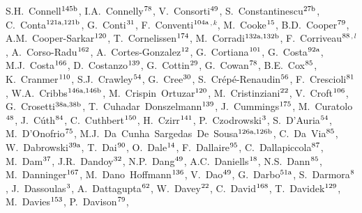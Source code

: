 \begin{flushleft}
S.H.~Connell$^\textrm{\scriptsize 145b}$,
I.A.~Connelly$^\textrm{\scriptsize 78}$,
V.~Consorti$^\textrm{\scriptsize 49}$,
S.~Constantinescu$^\textrm{\scriptsize 27b}$,
C.~Conta$^\textrm{\scriptsize 121a,121b}$,
G.~Conti$^\textrm{\scriptsize 31}$,
F.~Conventi$^\textrm{\scriptsize 104a}$$^{,k}$,
M.~Cooke$^\textrm{\scriptsize 15}$,
B.D.~Cooper$^\textrm{\scriptsize 79}$,
A.M.~Cooper-Sarkar$^\textrm{\scriptsize 120}$,
T.~Cornelissen$^\textrm{\scriptsize 174}$,
M.~Corradi$^\textrm{\scriptsize 132a,132b}$,
F.~Corriveau$^\textrm{\scriptsize 88}$$^{,l}$,
A.~Corso-Radu$^\textrm{\scriptsize 162}$,
A.~Cortes-Gonzalez$^\textrm{\scriptsize 12}$,
G.~Cortiana$^\textrm{\scriptsize 101}$,
G.~Costa$^\textrm{\scriptsize 92a}$,
M.J.~Costa$^\textrm{\scriptsize 166}$,
D.~Costanzo$^\textrm{\scriptsize 139}$,
G.~Cottin$^\textrm{\scriptsize 29}$,
G.~Cowan$^\textrm{\scriptsize 78}$,
B.E.~Cox$^\textrm{\scriptsize 85}$,
K.~Cranmer$^\textrm{\scriptsize 110}$,
S.J.~Crawley$^\textrm{\scriptsize 54}$,
G.~Cree$^\textrm{\scriptsize 30}$,
S.~Cr\'ep\'e-Renaudin$^\textrm{\scriptsize 56}$,
F.~Crescioli$^\textrm{\scriptsize 81}$,
W.A.~Cribbs$^\textrm{\scriptsize 146a,146b}$,
M.~Crispin~Ortuzar$^\textrm{\scriptsize 120}$,
M.~Cristinziani$^\textrm{\scriptsize 22}$,
V.~Croft$^\textrm{\scriptsize 106}$,
G.~Crosetti$^\textrm{\scriptsize 38a,38b}$,
T.~Cuhadar~Donszelmann$^\textrm{\scriptsize 139}$,
J.~Cummings$^\textrm{\scriptsize 175}$,
M.~Curatolo$^\textrm{\scriptsize 48}$,
J.~C\'uth$^\textrm{\scriptsize 84}$,
C.~Cuthbert$^\textrm{\scriptsize 150}$,
H.~Czirr$^\textrm{\scriptsize 141}$,
P.~Czodrowski$^\textrm{\scriptsize 3}$,
S.~D'Auria$^\textrm{\scriptsize 54}$,
M.~D'Onofrio$^\textrm{\scriptsize 75}$,
M.J.~Da~Cunha~Sargedas~De~Sousa$^\textrm{\scriptsize 126a,126b}$,
C.~Da~Via$^\textrm{\scriptsize 85}$,
W.~Dabrowski$^\textrm{\scriptsize 39a}$,
T.~Dai$^\textrm{\scriptsize 90}$,
O.~Dale$^\textrm{\scriptsize 14}$,
F.~Dallaire$^\textrm{\scriptsize 95}$,
C.~Dallapiccola$^\textrm{\scriptsize 87}$,
M.~Dam$^\textrm{\scriptsize 37}$,
J.R.~Dandoy$^\textrm{\scriptsize 32}$,
N.P.~Dang$^\textrm{\scriptsize 49}$,
A.C.~Daniells$^\textrm{\scriptsize 18}$,
N.S.~Dann$^\textrm{\scriptsize 85}$,
M.~Danninger$^\textrm{\scriptsize 167}$,
M.~Dano~Hoffmann$^\textrm{\scriptsize 136}$,
V.~Dao$^\textrm{\scriptsize 49}$,
G.~Darbo$^\textrm{\scriptsize 51a}$,
S.~Darmora$^\textrm{\scriptsize 8}$,
J.~Dassoulas$^\textrm{\scriptsize 3}$,
A.~Dattagupta$^\textrm{\scriptsize 62}$,
W.~Davey$^\textrm{\scriptsize 22}$,
C.~David$^\textrm{\scriptsize 168}$,
T.~Davidek$^\textrm{\scriptsize 129}$,
M.~Davies$^\textrm{\scriptsize 153}$,
P.~Davison$^\textrm{\scriptsize 79}$,

\end{flushleft}
